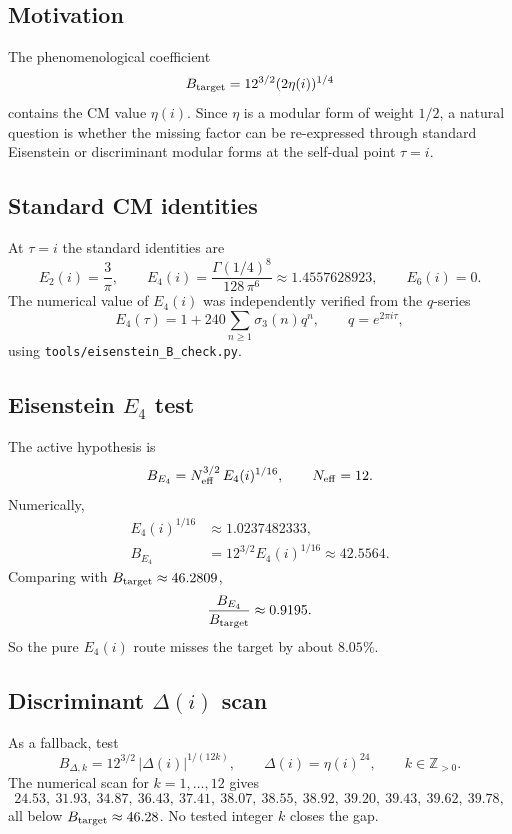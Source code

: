 \documentclass[12pt,a4paper]{article}
\begin{document}
\subsection{Motivation}

The phenomenological coefficient
\[
B_{\rm target}=12^{3/2}(2\eta(i))^{1/4}
\]
contains the CM value \(\eta(i)\). Since \(\eta\) is a modular form of
weight \(1/2\), a natural question is whether the missing factor can be
re-expressed through standard Eisenstein or discriminant modular forms at
the self-dual point \(\tau=i\).

\subsection{Standard CM identities}

At \(\tau=i\) the standard identities are
\[
E_2(i)=\frac{3}{\pi},\qquad
E_4(i)=\frac{\Gamma(1/4)^8}{128\,\pi^6}\approx 1.4557628923,\qquad
E_6(i)=0.
\]
The numerical value of \(E_4(i)\) was independently verified from the
\(q\)-series
\[
E_4(\tau)=1+240\sum_{n\ge1}\sigma_3(n)q^n,\qquad q=e^{2\pi i\tau},
\]
using \texttt{tools/eisenstein\_B\_check.py}.

\subsection{Eisenstein \(E_4\) test}

The active hypothesis is
\[
B_{E_4}=N_{\rm eff}^{3/2}\,E_4(i)^{1/16},\qquad N_{\rm eff}=12.
\]
Numerically,
\begin{align}
E_4(i)^{1/16} &\approx 1.0237482333,\\
B_{E_4} &= 12^{3/2}E_4(i)^{1/16}\approx 42.5564.
\end{align}
Comparing with \(B_{\rm target}\approx 46.2809\),
\[
\frac{B_{E_4}}{B_{\rm target}}\approx 0.9195.
\]
So the pure \(E_4(i)\) route misses the target by about \(8.05\%\).

\subsection{Discriminant \(\Delta(i)\) scan}

As a fallback, test
\[
B_{\Delta,k}=12^{3/2}\,|\Delta(i)|^{1/(12k)},\qquad
\Delta(i)=\eta(i)^{24},\qquad k\in\mathbb{Z}_{>0}.
\]
The numerical scan for \(k=1,\dots,12\) gives
\[
24.53,\ 31.93,\ 34.87,\ 36.43,\ 37.41,\ 38.07,\ 38.55,\ 38.92,\ 39.20,\ 39.43,\ 39.62,\ 39.78,
\]
all below \(B_{\rm target}\approx 46.28\). No tested integer \(k\) closes the gap.
\end{document}
